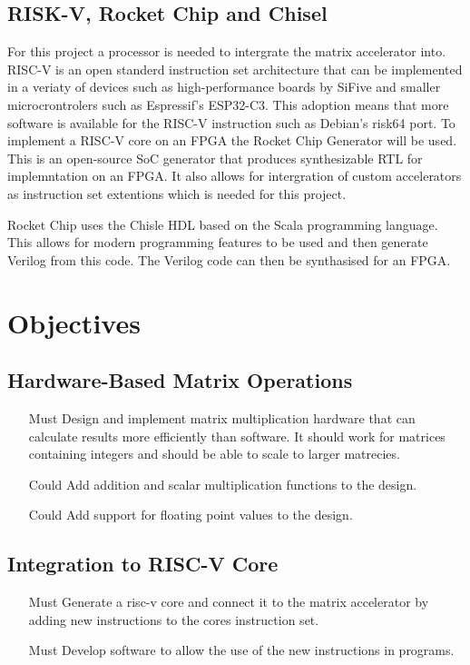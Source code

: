 \documentclass[a4paper,fleqn,12pt]{article}
\begin{document}
	\subsection{RISK-V, Rocket Chip and Chisel}
	For this project a processor is needed to intergrate the matrix accelerator into. RISC-V is an open standerd instruction set architecture that can be implemented in a veriaty of devices such as high-performance boards by SiFive and smaller microcrontrolers such as Espressif's ESP32-C3. This adoption means that more software is available for the RISC-V instruction such as Debian's risk64 port. To implement a RISC-V core on an FPGA the Rocket Chip Generator will be used. This is an open-source SoC generator that produces synthesizable RTL for implemntation on an FPGA. It also allows for intergration of custom accelerators as instruction set extentions \citep{rocketchip} which is needed for this project.
	
	Rocket Chip uses the Chisle HDL based on the Scala programming language. This allows for modern programming features to be used and then generate Verilog from this code. The Verilog code can then be synthasised for an FPGA.
	
	\section{Objectives}
	\subsection{Hardware-Based Matrix Operations}
	\begin{enumerate}
		\item [Must]  Design and implement matrix multiplication hardware that can calculate results more efficiently than software. It should work for matrices containing integers and should be able to scale to larger matrecies.
		\item [Could] Add addition and scalar multiplication functions to the design.
		\item [Could] Add support for floating point values to the design.
	\end{enumerate}
	\subsection{Integration to RISC-V Core}
	\begin{enumerate}
		\item [Must] Generate a risc-v core and connect it to the matrix accelerator by adding new instructions to the cores instruction set.
		\item [Must] Develop software to allow the use of the new instructions in programs.
	\end{enumerate}
\end{document}
